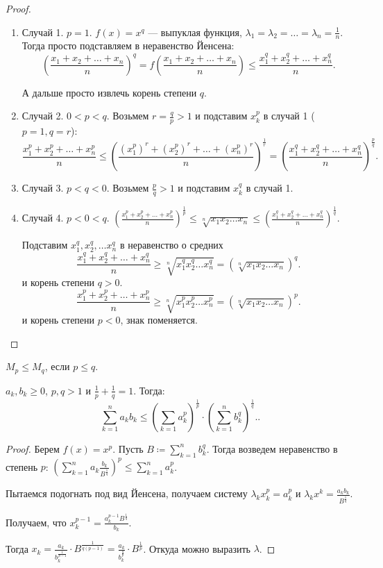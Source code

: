 \begin{proof}
    \slashn
    \begin{enumerate}
        \item Случай 1. $p = 1$.  $f(x) = x^q$ --- выпуклая функция,  $\lambda_1 = \lambda_2 = \ldots = \lambda_n = \frac{1}{n}$. Тогда просто подставляем в неравенство Йенсена:
            \[\left( \frac{x_1 + x_2 + \ldots + x_n}{n} \right)^q = f\left(\frac{x_1 + x_2 + \ldots + x_n}{n}\right) \le \frac{x_1^q + x_2^q + \ldots + x_n^q}{n}.\]

            А дальше просто извлечь корень степени $q$.
        \item Случай 2.  $0 < p < q$. Возьмем  $r = \frac{q}{p} > 1$ и подставим $x_k^p$ в случай 1 ($p = 1, q = r$): \[
                \frac{x_1 ^ p + x_2^p + \ldots + x_n^p}{n} \le \left( \frac{(x_1 ^ p)^r + (x_2^p)^r + \ldots + (x_n^p)^r}{n} \right)^{\frac{1}{r}} = \left( \frac{x_1 ^ q + x_2^q + \ldots + x_n^q}{n} \right)^{\frac{p}{q}}
        .\] 
        \item Случай 3. $p < q < 0$. Возьмем  $\frac{p}{q} > 1$ и подставим $x_k^q$ в случай 1.
        \item Случай 4.  $p < 0 < q$.  $\left( \frac{x_1 ^ p + x_2^p + \ldots + x_n^p}{n} \right)^{\frac{1}{p}} \le \sqrt[n]{x_1x_2\ldots x_n} \le \left( \frac{x_1 ^ q + x_2^q + \ldots + x_n^q}{n} \right)^{\frac{1}{q}}$.

            Подставим $x_1^q, x_2^q,\ldots x_n^q$ в неравенство о средних \[
                \frac{x_1^q + x_2^q + \ldots + x_n^q}{n} \ge \sqrt[n]{x_1^qx_2^q\ldots x_n^q} = \left(\sqrt[n]{x_1x_2\ldots x_n}\right)^q
            .\] и корень степени $q > 0$.
            \[
                \frac{x_1^p + x_2^p + \ldots + x_n^p}{n} \ge \sqrt[n]{x_1^px_2^p\ldots x_n^p} = \left(\sqrt[n]{x_1x_2\ldots x_n}\right)^p
            .\] и корень степени $p < 0$, знак поменяется.
    \end{enumerate}
\end{proof}
\begin{remark}
    $M_p \le M_q$, если $p \le q$.
\end{remark}
\begin{theorem}
    $a_k, b_k \ge 0$, $p, q > 1$ и  $\frac{1}{p} + \frac{1}{q} = 1$. Тогда: \[
        \sum_{k=1}^{n} a_kb_k \le \left(\sum_{k=1}a_k^p\right)^{\frac{1}{p}} \cdot \left(\sum_{k=1}^n b_k^q\right)^{\frac{1}{q}}.
    .\] 
\end{theorem}
\begin{proof}
    Берем $f(x) = x^p$. Пусть  $B \coloneqq \sum_{k=1}^n b_k^q$. Тогда возведем неравенство в степень  $p$:  $\left(\sum_{k=1}^n a_k \frac{b_k}{B^{\frac{1}{q}}}\right)^p \le \sum_{k=1}^n a_k^p$. 

    Пытаемся подогнать под вид Йенсена, получаем систему $\lambda_kx_k^p = a_k^p$ и  $\lambda_k x^k = \frac{a_k b_k}{B^{\frac{1}{q}}}$. 

    Получаем, что $x_k^{p-1} = \frac{a_k^{p-1}B^{\frac{1}{q}}}{b_k}$.

    Тогда $x_k = \frac{a_k}{b_k^{\frac{1}{p-1}}} \cdot B^{\frac{1}{q(p-1)}} = \frac{a_k}{b_k^{\frac{q}{p}}} \cdot B^{\frac{1}{p}}$. Откуда можно выразить $\lambda$.
\end{proof}
